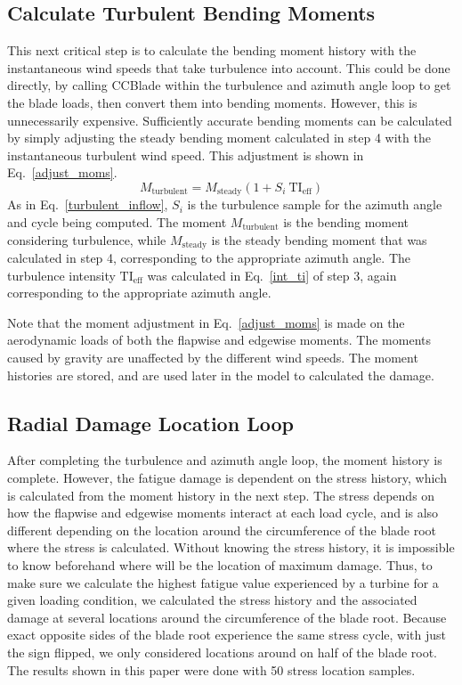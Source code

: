 \documentclass[11pt,letterpaper]{article}
\begin{document}
\subsection{Calculate Turbulent Bending Moments}
This next critical step is to calculate the bending moment history with the instantaneous wind speeds that take turbulence into account. This could be done directly, by calling CCBlade within the turbulence and azimuth angle loop to get the blade loads, then convert them into bending moments. However, this is unnecessarily expensive. Sufficiently accurate bending moments can be calculated by simply adjusting the steady bending moment calculated in step 4 with the instantaneous turbulent wind speed. This adjustment is shown in Eq.~\ref{adjust_moms}.
% 
\begin{equation}
    \label{adjust_moms}
    M_{\text{turbulent}} = M_{\text{steady}}(1 + S_i ~\text{TI}_\text{eff})
\end{equation}
% 
As in Eq.~\ref{turbulent_inflow}, $S_i$ is the turbulence sample for the azimuth angle and cycle being computed. The moment $M_{\text{turbulent}}$ is the bending moment considering turbulence, while $M_{\text{steady}}$ is the steady bending moment that was calculated in step 4, corresponding to the appropriate azimuth angle. The turbulence intensity $\text{TI}_{\text{eff}}$ was calculated in Eq.~\ref{int_ti} of step 3, again corresponding to the appropriate azimuth angle.

Note that the moment adjustment in Eq.~\ref{adjust_moms} is made on the aerodynamic loads of both the flapwise and edgewise moments. The moments caused by gravity are unaffected by the different wind speeds. The moment histories are stored, and are used later in the model to calculated the damage.

\subsection{Radial Damage Location Loop}

After completing the turbulence and azimuth angle loop, the moment history is complete. However, the fatigue damage is dependent on the stress history, which is calculated from the moment history in the next step. The stress depends on how the flapwise and edgewise moments interact at each load cycle, and is also different depending on the location around the circumference of the blade root where the stress is calculated. Without knowing the stress history, it is impossible to know beforehand where will be the location of maximum damage. Thus, to make sure we calculate the highest fatigue value experienced by a turbine for a given loading condition, we calculated the stress history and the associated damage at several locations around the circumference of the blade root. Because exact opposite sides of the blade root experience the same stress cycle, with just the sign flipped, we only considered locations around on half of the blade root. The results shown in this paper were done with 50 stress location samples.
\end{document}
